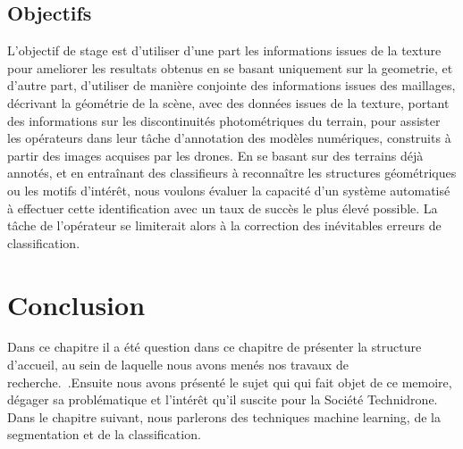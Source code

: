 \subsection{Objectifs}

L’objectif de stage est d’utiliser d'une part les informations issues de la texture pour 
ameliorer les resultats obtenus en se basant uniquement sur la geometrie, et d'autre part, d’utiliser
de manière conjointe des informations issues des maillages, 
décrivant la géométrie de la scène, avec des données issues de la texture, portant des informations 
sur les discontinuités photométriques du terrain, pour assister les opérateurs dans leur tâche d’annotation 
des modèles numériques, construits à partir des images acquises par les drones.
En se basant sur des terrains déjà annotés, et en entraînant des classifieurs à reconnaître
les structures géométriques ou les motifs d’intérêt, nous voulons évaluer la capacité d’un système automatisé 
à effectuer cette identification avec un taux de succès le plus élevé possible. La tâche de 
l’opérateur se limiterait alors à la correction des inévitables erreurs de classification.



\section*{Conclusion}
Dans ce chapitre il  a été question dans ce chapitre de présenter  la structure d’accueil,
au sein de laquelle nous avons menés nos travaux de recherche. .Ensuite nous avons
présenté le sujet qui qui fait objet de ce memoire, dégager sa problématique et
l’intérêt qu’il suscite pour la Société Technidrone. Dans le chapitre suivant,
nous parlerons des techniques machine learning, de la segmentation et de la classification.
